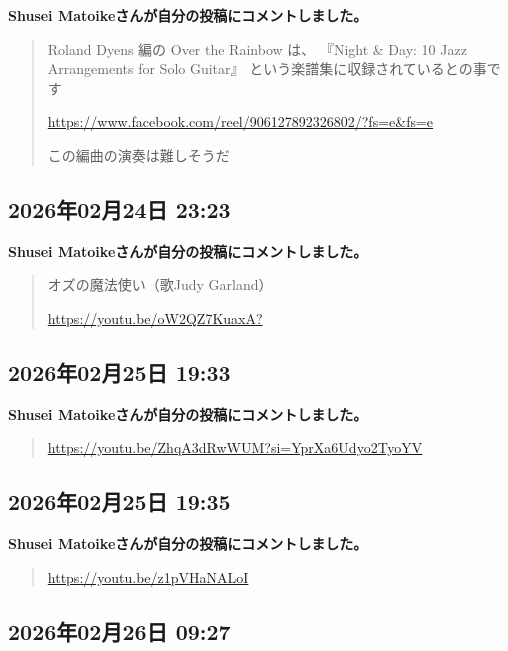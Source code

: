 \textbf{Shusei Matoikeさんが自分の投稿にコメントしました。}

\begin{quote}
Roland Dyens 編の Over the Rainbow は、 『Night \& Day: 10 Jazz Arrangements for Solo Guitar』 という楽譜集に収録されているとの事です

\url{https://www.facebook.com/reel/906127892326802/?fs=e&fs=e}

この編曲の演奏は難しそうだ
\end{quote}

\subsection*{2026年02月24日 23:23}

\textbf{Shusei Matoikeさんが自分の投稿にコメントしました。}

\begin{quote}
オズの魔法使い（歌Judy Garland）

\url{https://youtu.be/oW2QZ7KuaxA?}
\end{quote}

\subsection*{2026年02月25日 19:33}

\textbf{Shusei Matoikeさんが自分の投稿にコメントしました。}

\begin{quote}
\url{https://youtu.be/ZhqA3dRwWUM?si=YprXa6Udyo2TyoYV}
\end{quote}

\subsection*{2026年02月25日 19:35}

\textbf{Shusei Matoikeさんが自分の投稿にコメントしました。}

\begin{quote}
\url{https://youtu.be/z1pVHaNALoI}
\end{quote}

\subsection*{2026年02月26日 09:27}

